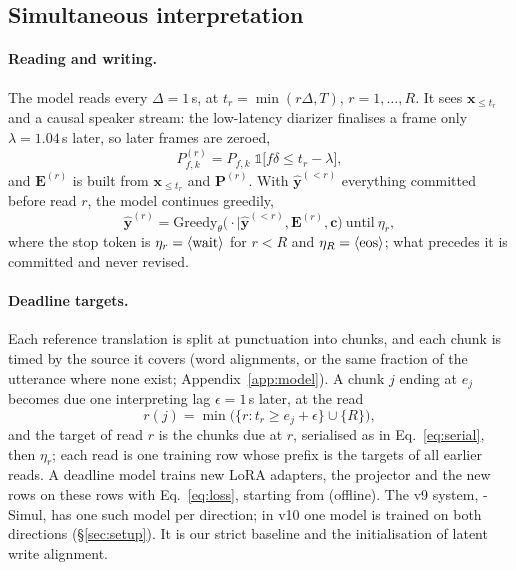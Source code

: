\subsection{Simultaneous interpretation}
\label{sec:method-simul}

\paragraph{Reading and writing.} The model reads every $\Delta=1$\,s, at $t_r=\min(r\Delta,T)$, $r=1,\dots,R$. It sees
$\bm{x}_{\le t_r}$ and a causal speaker stream: the low-latency diarizer finalises a frame only $\lambda=1.04$\,s later,
so later frames are zeroed,
\begin{equation}
P^{(r)}_{f,k}=P_{f,k}\;\mathds{1}\big[f\delta\le t_r-\lambda\big],
\label{eq:causal}
\end{equation}
and $\bm{E}^{(r)}$ is built from $\bm{x}_{\le t_r}$ and $\bm{P}^{(r)}$. With $\hat{\bm{y}}^{(<r)}$ everything committed
before read $r$, the model continues greedily,
\begin{equation}
\hat{\bm{y}}^{(r)}=\mathrm{Greedy}_\theta\big(\cdot\mid\hat{\bm{y}}^{(<r)},\bm{E}^{(r)},\bm{c}\big)\ \text{until}\ \eta_r,
\label{eq:write}
\end{equation}
where the stop token is $\eta_r=\langle\mathrm{wait}\rangle$ for $r<R$ and $\eta_R=\langle\mathrm{eos}\rangle$; what precedes it is committed and never revised.

\paragraph{Deadline targets.} Each reference translation is split at punctuation into chunks, and each chunk is timed by
the source it covers (word alignments, or the same fraction of the utterance where none exist; Appendix~\ref{app:model}).
A chunk $j$ ending at $e_j$ becomes due one interpreting lag $\epsilon=1$\,s later, at the read
\begin{equation}
r(j)=\min\big(\{r: t_r\ge e_j+\epsilon\}\cup\{R\}\big),
\label{eq:due}
\end{equation}
and the target of read $r$ is the chunks due at $r$, serialised as in Eq.~\eqref{eq:serial}, then $\eta_r$; each read is
one training row whose prefix is the targets of all earlier reads. A deadline model trains new LoRA adapters, the
projector and the new rows on these rows with Eq.~\eqref{eq:loss}, starting from \sys{} (offline). The v9 system,
\sys{}-Simul, has one such model per direction; in v10 one model is trained on both directions (\S\ref{sec:setup}). It is
our strict baseline and the initialisation of latent write alignment.

